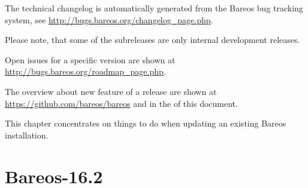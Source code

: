 \label{releasenotes}

The technical changelog is automatically generated from the Bareos bug tracking system, see \url{http://bugs.bareos.org/changelog_page.php}.

Please note, that some of the subreleases are only internal development releases.

Open issues for a specific version are shown at
\url{http://bugs.bareos.org/roadmap_page.php}.

The overview about new feature of a release are shown at
\url{https://github.com/bareos/bareos} and in the  of this document.

This chapter concentrates on things to do when updating an existing Bareos installation.


\section*{Bareos-16.2}

